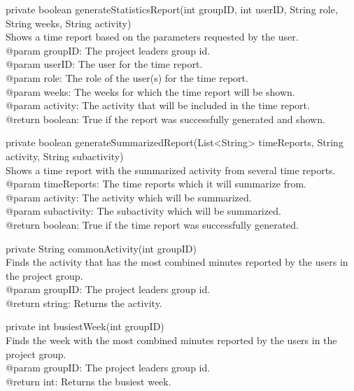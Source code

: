 \documentclass[a4paper]{article}
\begin{document}
\begin{hangparas}{1.5em}{1}
private boolean generateStatisticsReport(int groupID, int userID, String role, String weeks, String activity)\\
Shows a time report based on the parameters requested by the user.\\
@param groupID: The project leaders group id.\\
@param userID: The user for the time report.\\
@param role: The role of the user(s) for the time report.\\
@param weeks: The weeks for which the time report will be shown.\\
@param activity: The activity that will be included in the time report.\\
@return boolean: True if the report was successfully generated and shown.
\end{hangparas}

\vspace{5mm}
\begin{hangparas}{1.5em}{1}
private boolean generateSummarizedReport(List<String> timeReports, String activity, String subactivity)\\
Shows a time report with the summarized activity from several time reports.\\
@param timeReports: The time reports which it will summarize from.\\
@param activity: The activity which will be summarized.\\
@param subactivity: The subactivity which will be summarized.\\
@return boolean: True if the time report was successfully generated.
\end{hangparas}

\vspace{5mm}
\begin{hangparas}{1.5em}{1}
private String commonActivity(int groupID)\\
Finds the activity that has the most combined minutes reported by the users in the project group.\\
@param groupID: The project leaders group id.\\
@return string: Returns the activity.
\end{hangparas}

\vspace{5mm}
\begin{hangparas}{1.5em}{1}
private int busiestWeek(int groupID)\\
Finds the week with the most combined minutes reported by the users in the project group.\\
@param groupID: The project leaders group id.\\
@return int: Returns the busiest week.\\
\end{hangparas}
\end{document}
